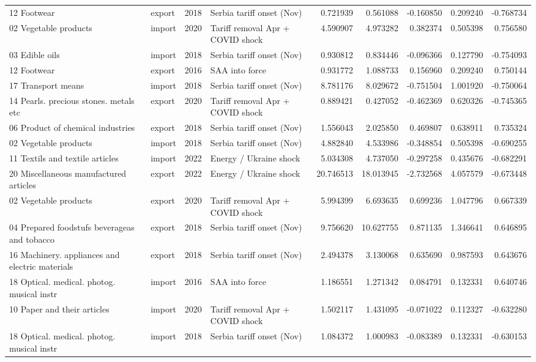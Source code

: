 \begin{tabular}{llrlrrrrr}
12 Footwear & export & 2018 & Serbia tariff onset (Nov) & 0.721939 & 0.561088 & -0.160850 & 0.209240 & -0.768734 \\
02 Vegetable products & import & 2020 & Tariff removal Apr + COVID shock & 4.590907 & 4.973282 & 0.382374 & 0.505398 & 0.756580 \\
03 Edible oils & import & 2018 & Serbia tariff onset (Nov) & 0.930812 & 0.834446 & -0.096366 & 0.127790 & -0.754093 \\
12 Footwear & export & 2016 & SAA into force & 0.931772 & 1.088733 & 0.156960 & 0.209240 & 0.750144 \\
17 Transport means & import & 2018 & Serbia tariff onset (Nov) & 8.781176 & 8.029672 & -0.751504 & 1.001920 & -0.750064 \\
14 Pearls. precious stones. metals etc & export & 2020 & Tariff removal Apr + COVID shock & 0.889421 & 0.427052 & -0.462369 & 0.620326 & -0.745365 \\
06 Product of chemical industries & export & 2018 & Serbia tariff onset (Nov) & 1.556043 & 2.025850 & 0.469807 & 0.638911 & 0.735324 \\
02 Vegetable products & import & 2018 & Serbia tariff onset (Nov) & 4.882840 & 4.533986 & -0.348854 & 0.505398 & -0.690255 \\
11 Textils and textile articles & import & 2022 & Energy / Ukraine shock & 5.034308 & 4.737050 & -0.297258 & 0.435676 & -0.682291 \\
20 Miscellaneous manufactured articles & export & 2022 & Energy / Ukraine shock & 20.746513 & 18.013945 & -2.732568 & 4.057579 & -0.673448 \\
02 Vegetable products & export & 2020 & Tariff removal Apr + COVID shock & 5.994399 & 6.693635 & 0.699236 & 1.047796 & 0.667339 \\
04 Prepared foodstufs beverageas and tobacco & export & 2018 & Serbia tariff onset (Nov) & 9.756620 & 10.627755 & 0.871135 & 1.346641 & 0.646895 \\
16 Machinery. appliances and electric materials & export & 2018 & Serbia tariff onset (Nov) & 2.494378 & 3.130068 & 0.635690 & 0.987593 & 0.643676 \\
18 Optical. medical. photog. musical instr & import & 2016 & SAA into force & 1.186551 & 1.271342 & 0.084791 & 0.132331 & 0.640746 \\
10 Paper and their articles & import & 2020 & Tariff removal Apr + COVID shock & 1.502117 & 1.431095 & -0.071022 & 0.112327 & -0.632280 \\
18 Optical. medical. photog. musical instr & import & 2018 & Serbia tariff onset (Nov) & 1.084372 & 1.000983 & -0.083389 & 0.132331 & -0.630153 \\

\end{tabular}
